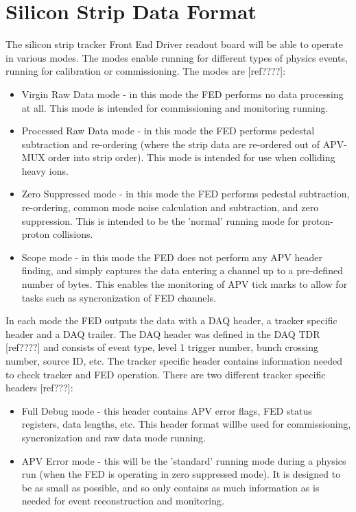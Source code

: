 \section{Silicon Strip Data Format}\label{sec:SiStrip}
The silicon strip tracker Front End Driver readout board will be able to operate in
various modes. The modes enable running for different types of physics events, running
for calibration or commissioning. The modes are [ref????]:
\begin{itemize}
\item Virgin Raw Data mode - in this mode the FED performs no data processing at all. This mode
is intended for commissioning and monitoring running.
\item Processed Raw Data mode - in this mode the FED performs pedestal subtraction and re-ordering (where
the strip data are re-ordered out of APV-MUX order into strip order). This mode is intended for use
when colliding heavy ions.
\item Zero Suppressed mode - in this mode the FED performs pedestal subtraction, re-ordering, common mode noise
calculation and subtraction, and zero suppression. This is intended to be the 'normal' running mode for 
proton-proton collisions.
\item Scope mode - in this mode the FED does not perform any APV header finding, and simply captures the data
entering a channel up to a pre-defined number of bytes. This enables the monitoring of APV tick marks to 
allow for tasks such as syncronization of FED channels.
\end{itemize}

In each mode the FED outputs the data with a DAQ header, a tracker specific header and a DAQ trailer. The DAQ
header was defined in the DAQ TDR [ref????] and consists of event type, level 1 trigger number, bunch crossing number,
source ID, etc. The tracker specific header contains information needed to check tracker and FED operation. 
There are two different tracker specific headers [ref???]: 
\begin{itemize}
\item Full Debug mode - this header contains APV error flags, FED status registers, data lengths, etc. This 
header format willbe used for commissioning, syncronization and raw data mode running.
\item APV Error mode - this will be the 'standard' running mode during a physics run (when the FED is operating
in zero suppressed mode). It is designed to be as small as possible, and so only contains as much information as
is needed for event reconstruction and monitoring.
\end{itemize}

